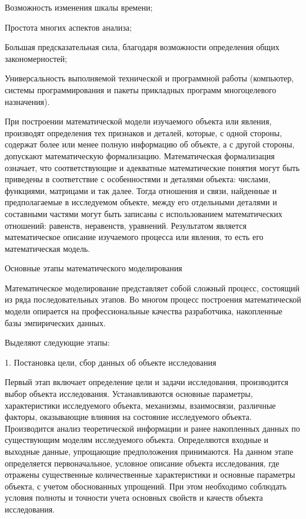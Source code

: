 Возможность изменения шкалы времени; 

Простота многих аспектов анализа;


Большая предсказательная сила, благодаря возможности определения общих закономерностей;


Универсальность выполняемой технической и программной работы (компьютер, системы программирования и пакеты прикладных программ многоцелевого назначения).\cite{b6}



При построении математической модели изучаемого объекта или явления, производят определения тех  признаков и деталей, которые, с одной стороны, содержат более или менее полную информацию об объекте, а с другой стороны, допускают математическую формализацию. Математическая формализация означает, что соответствующие и адекватные математические понятия могут быть приведены в соответствие с особенностями и деталями объекта: числами, функциями, матрицами и так далее. Тогда отношения и связи, найденные и предполагаемые в исследуемом объекте, между его отдельными деталями и составными частями могут быть записаны с использованием математических отношений: равенств, неравенств, уравнений. Результатом является математическое описание изучаемого процесса или явления, то есть его математическая модель.



Основные этапы математического моделирования


Математическое моделирование представляет собой сложный процесс, состоящий из ряда последовательных этапов.  Во многом процесс построения математической модели опирается на профессиональные качества разработчика, накопленные базы эмпирических данных.


Выделяют следующие этапы: 


1.	Постановка цели, сбор данных об объекте исследования



Первый этап включает определение цели и задачи исследования, производится выбор объекта исследования. Устанавливаются основные параметры, характеристики исследуемого объекта, механизмы, взаимосвязи, различные факторы, оказывающие влияния на состояние исследуемого объекта. Производится анализ теоретической информации и ранее накопленных данных по существующим моделям исследуемого объекта. Определяются входные и выходные данные, упрощающие предположения принимаются. На данном этапе определяется первоначальное, условное описание объекта исследования, где отражены существенные количественные характеристики и основные параметры объекта, с учетом обоснованных упрощений. При этом необходимо соблюдать условия полноты и точности учета основных свойств и качеств объекта исследования.

